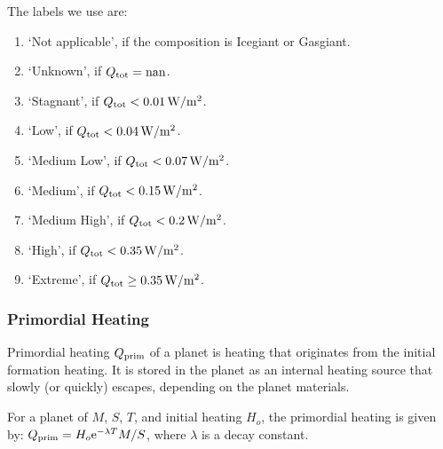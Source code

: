 \documentclass[letterpaper,10pt,english]{sphinxmanual}
\begin{document}
\sphinxAtStartPar
The labels we use are:
\begin{enumerate}
%
\item {} 
\sphinxAtStartPar
‘Not applicable’, if the composition is Icegiant or Gasgiant.

\item {} 
\sphinxAtStartPar
‘Unknown’, if \(Q_{\rm tot} = {\rm nan}\).

\item {} 
\sphinxAtStartPar
‘Stagnant’, if \(Q_{\rm tot} < 0.01 \, {\rm W/m^2}\).

\item {} 
\sphinxAtStartPar
‘Low’, if \(Q_{\rm tot} < 0.04 \, {\rm W/m^2}\).

\item {} 
\sphinxAtStartPar
‘Medium Low’, if \(Q_{\rm tot} < 0.07 \, {\rm W/m^2}\).

\item {} 
\sphinxAtStartPar
‘Medium’, if \(Q_{\rm tot} < 0.15 \, {\rm W/m^2}\).

\item {} 
\sphinxAtStartPar
‘Medium High’, if \(Q_{\rm tot} < 0.2 \, {\rm W/m^2}\).

\item {} 
\sphinxAtStartPar
‘High’, if \(Q_{\rm tot} < 0.35 \, {\rm W/m^2}\).

\item {} 
\sphinxAtStartPar
‘Extreme’, if \(Q_{\rm tot} \ge 0.35 \, {\rm W/m^2}\).

\end{enumerate}


\subsubsection{Primordial Heating}
\label{\detokenize{quantities/surface/internal_heating/primordial_heating:primordial-heating}}\label{\detokenize{quantities/surface/internal_heating/primordial_heating::doc}}\label{\detokenize{quantities/surface/internal_heating/primordial_heating:id1}}
\sphinxAtStartPar
Primordial heating \(Q_{\rm prim}\) of a planet is heating that originates from the initial formation heating.
It is stored in the planet as an internal heating source that slowly (or quickly)
escapes, depending on the planet materials.

\sphinxAtStartPar
For a planet of {\hyperref[\detokenize{quantities/material/mass:id1}]{}} \(M\), {\hyperref[\detokenize{quantities/geometric/surface_area:id1}]{}} \(S\),
{\hyperref[\detokenize{quantities/life/age:id1}]{}} \(T\), and initial heating \(H_o\), the primordial heating is given by:
\(Q_{\rm prim} = H_o {\rm e}^{- \lambda T} M / S\), where \(\lambda\) is a decay constant.
\end{document}
